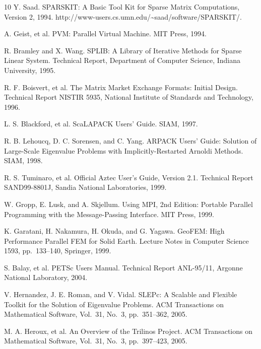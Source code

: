 \documentclass[a4paper]{article}
\begin{document}
\begin{thebibliography}{10}
Y. Saad.
\newblock SPARSKIT: A Basic Tool Kit for Sparse Matrix Computations,
  Version 2, 1994.
\newblock http://www-users.cs.umn.edu/\textasciitilde saad/software/SPARSKIT/.

A. Geist, et al.
\newblock PVM: Parallel Virtual Machine.
\newblock MIT Press, 1994.

R. Bramley and X. Wang.
\newblock SPLIB: A Library of Iterative Methods for Sparse Linear System.
\newblock Technical Report, Department of Computer Science, Indiana University, 1995.

R. F. Boisvert, et al. 
\newblock The Matrix Market Exchange Formats: Initial Design. 
\newblock Technical Report NISTIR 5935, National Institute of Standards and
	Technology, 1996.

L. S. Blackford, et al.
\newblock ScaLAPACK Users' Guide.
\newblock SIAM, 1997.

R. B. Lehoucq, D. C. Sorensen, and C. Yang.
\newblock ARPACK Users' Guide: Solution of Large-Scale Eigenvalue Problems with Implicitly-Restarted Arnoldi Methods. 
\newblock SIAM, 1998. 

R. S. Tuminaro, et al.
\newblock Official Aztec User's Guide, Version 2.1.
\newblock Technical Report SAND99-8801J, Sandia National Laboratories, 1999.

W. Gropp, E. Lusk, and A. Skjellum.
\newblock Using MPI, 2nd Edition: Portable Parallel Programming with the
	Message-Passing Interface.
\newblock MIT Press, 1999.

K. Garatani, H. Nakamura, H. Okuda, and G. Yagawa.
\newblock GeoFEM: High Performance Parallel FEM for Solid Earth.
\newblock Lecture Notes in Computer Science 1593, pp.\ 133--140, Springer, 1999.

S. Balay, et al.
\newblock PETSc Users Manual.
\newblock Technical Report ANL-95/11, Argonne National Laboratory, 2004.

V. Hernandez, J. E. Roman, and V. Vidal.
\newblock SLEPc: A Scalable and Flexible Toolkit for the Solution of
	Eigenvalue Problems.
\newblock ACM Transactions on Mathematical Software,  Vol.~31, No.~3, pp.\ 351--362, 2005.

M. A. Heroux, et al.
\newblock An Overview of the Trilinos Project.
\newblock ACM Transactions on Mathematical Software,  Vol.~31, No.~3, pp.\ 397--423, 2005.


\end{thebibliography}
\end{document}
